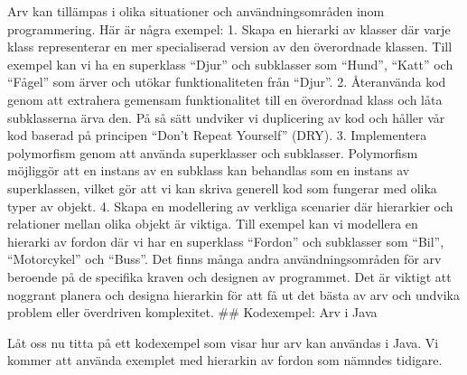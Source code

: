 Arv kan tillämpas i olika situationer och användningsområden inom
programmering. Här är några exempel: 1. Skapa en hierarki av klasser där
varje klass representerar en mer specialiserad version av den
överordnade klassen. Till exempel kan vi ha en superklass ``Djur'' och
subklasser som ``Hund'', ``Katt'' och ``Fågel'' som ärver och utökar
funktionaliteten från ``Djur''. 2. Återanvända kod genom att extrahera
gemensam funktionalitet till en överordnad klass och låta subklasserna
ärva den. På så sätt undviker vi duplicering av kod och håller vår kod
baserad på principen ``Don't Repeat Yourself'' (DRY). 3. Implementera
polymorfism genom att använda superklasser och subklasser. Polymorfism
möjliggör att en instans av en subklass kan behandlas som en instans av
superklassen, vilket gör att vi kan skriva generell kod som fungerar med
olika typer av objekt. 4. Skapa en modellering av verkliga scenarier där
hierarkier och relationer mellan olika objekt är viktiga. Till exempel
kan vi modellera en hierarki av fordon där vi har en superklass
``Fordon'' och subklasser som ``Bil'', ``Motorcykel'' och ``Buss''. Det
finns många andra användningsområden för arv beroende på de specifika
kraven och designen av programmet. Det är viktigt att noggrant planera
och designa hierarkin för att få ut det bästa av arv och undvika problem
eller överdriven komplexitet. \#\# Kodexempel: Arv i Java

Låt oss nu titta på ett kodexempel som visar hur arv kan användas i
Java. Vi kommer att använda exemplet med hierarkin av fordon som nämndes
tidigare.

